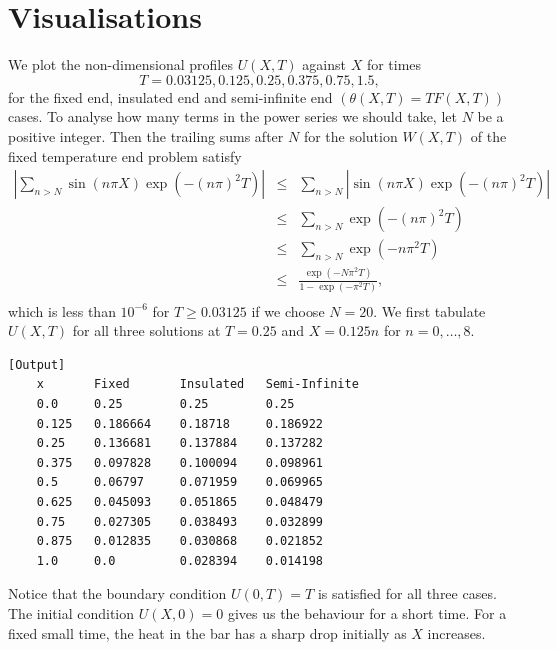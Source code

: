 \documentclass{article}
\begin{document}
\section{Visualisations}
We plot the non-dimensional profiles \(U(X, T)\) against \(X\) for times
\[ T = 0.03125, 0.125, 0.25, 0.375, 0.75, 1.5, \]
for the fixed end, insulated end and semi-infinite end \((\theta(X, T) = TF(X, T))\) cases. To analyse how many terms in the power series we should take, let \(N\) be a positive integer. Then the trailing sums after \(N\) for the solution \(W(X, T)\) of the fixed temperature end problem satisfy
\begin{eqnarray*} 
    \left|\sum_{n > N} \sin(n\pi X)\exp(-(n\pi)^2T)\right| & \leq & \sum_{n > N} \left|  \sin(n\pi X)\exp(-(n\pi)^2T)\right| \\
    & \leq & \sum_{n > N} \exp(-(n\pi)^2T) \\
    & \leq & \sum_{n > N} \exp(-n\pi^2T) \\
    & \leq &  \frac{\exp(-N\pi^2T)}{1 - \exp(-\pi^2T)}, \\
\end{eqnarray*}
which is less than \(10^{-6}\) for \(T \geq 0.03125\) if we choose \(N = 20\). We first tabulate \(U(X, T)\) for all three solutions at \(T = 0.25\) and \(X = 0.125n\) for \(n = 0, \dots, 8\).
\begin{verbatim}[Output]
    x       Fixed       Insulated   Semi-Infinite
    0.0     0.25        0.25        0.25
    0.125   0.186664    0.18718     0.186922
    0.25    0.136681    0.137884    0.137282
    0.375   0.097828    0.100094    0.098961
    0.5     0.06797     0.071959    0.069965
    0.625   0.045093    0.051865    0.048479
    0.75    0.027305    0.038493    0.032899
    0.875   0.012835    0.030868    0.021852
    1.0     0.0         0.028394    0.014198
\end{verbatim}
Notice that the boundary condition \(U(0,T) = T\) is satisfied for all three cases. The initial condition \(U(X, 0) = 0\) gives us the behaviour for a short time. For a fixed small time, the heat in the bar has a sharp drop initially as \(X\) increases.
\end{document}
